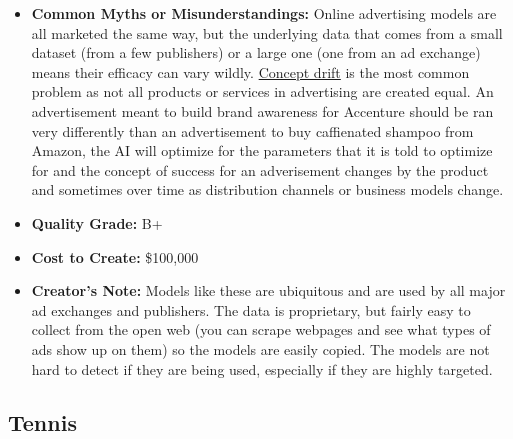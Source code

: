 \begin{itemize}
    \item \textbf{Common Myths or Misunderstandings:} Online advertising models are all marketed the same way, but the underlying data that comes from a small dataset (from a few publishers) or a large one (one from an ad exchange) means their efficacy can vary wildly. \hyperref[sec:drift]{Concept drift} is the most common problem as not all products or services in advertising are created equal. An advertisement meant to build brand awareness for Accenture should be ran very differently than an advertisement to buy caffienated shampoo from Amazon, the AI will optimize for the parameters that it is told to optimize for and the concept of success for an adverisement changes by the product and sometimes over time as distribution channels or business models change.  
    \item \textbf{Quality Grade:} B+
    \item \textbf{Cost to Create:} \$100,000
    \item \textbf{Creator's Note:} Models like these are ubiquitous and are used by all major ad exchanges and publishers. The data is proprietary, but fairly easy to collect from the open web (you can scrape webpages and see what types of ads show up on them) so the models are easily copied. The models are not hard to detect if they are being used, especially if they are highly targeted.
\end{itemize}

\subsection{Tennis}

